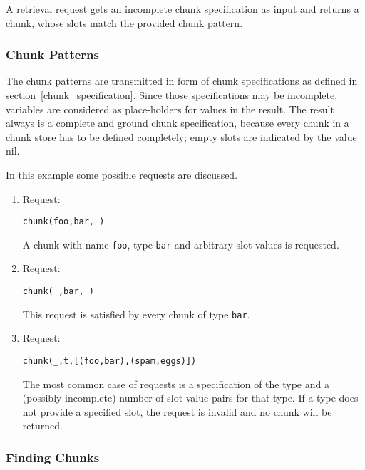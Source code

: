 A retrieval request gets an incomplete chunk specification as input and returns a chunk, whose slots match the provided chunk pattern.

\subsubsection{Chunk Patterns}

The chunk patterns are transmitted in form of chunk specifications as defined in section~\ref{chunk_specification}. Since those specifications may be incomplete, variables are considered as place-holders for values in the result. The result always is a complete and ground chunk specification, because every chunk in a chunk store has to be defined completely; empty slots are indicated by the value nil.

\begin{example}
In this example some possible requests are discussed.

\begin{enumerate}
 \item Request:
\begin{lstlisting}
chunk(foo,bar,_)        
\end{lstlisting}

A chunk with name \lstinline|foo|, type \lstinline|bar| and arbitrary slot values is requested.

 \item Request:
\begin{lstlisting}
chunk(_,bar,_)        
\end{lstlisting}

This request is satisfied by every chunk of type \lstinline|bar|.

 \item Request:
\begin{lstlisting}
chunk(_,t,[(foo,bar),(spam,eggs)])        
\end{lstlisting}

The most common case of requests is a specification of the type and a (possibly incomplete) number of slot-value pairs for that type. If a type does not provide a specified slot, the request is invalid and no chunk will be returned.

\end{enumerate}

\end{example}

\subsubsection{Finding Chunks}

